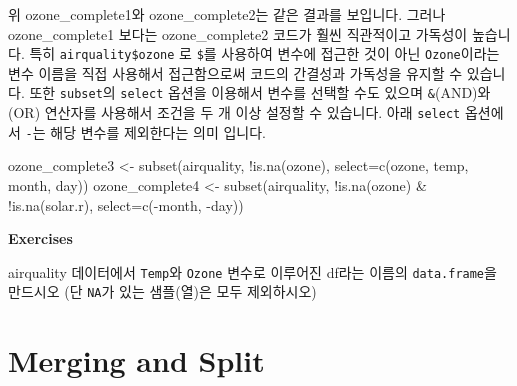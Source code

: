 \documentclass[
]{book}
\newenvironment{Shaded}{\begin{snugshade}}{\end{snugshade}}
\newcommand{\AttributeTok}[1]{\textcolor[rgb]{0.77,0.63,0.00}{#1}}
\newcommand{\FunctionTok}[1]{\textcolor[rgb]{0.00,0.00,0.00}{#1}}
\newcommand{\NormalTok}[1]{#1}
\newcommand{\OtherTok}[1]{\textcolor[rgb]{0.56,0.35,0.01}{#1}}
\newcommand{\SpecialCharTok}[1]{\textcolor[rgb]{0.00,0.00,0.00}{#1}}
\begin{document}
\begin{Shaded}
\end{Shaded}

위 ozone\_complete1와 ozone\_complete2는 같은 결과를 보입니다. 그러나 ozone\_complete1 보다는 ozone\_complete2 코드가 훨씬 직관적이고 가독성이 높습니다. 특히 \texttt{airquality\$ozone} 로 \texttt{\$}를 사용하여 변수에 접근한 것이 아닌 \texttt{Ozone}이라는 변수 이름을 직접 사용해서 접근함으로써 코드의 간결성과 가독성을 유지할 수 있습니다. 또한 \texttt{subset}의 \texttt{select} 옵션을 이용해서 변수를 선택할 수도 있으며 \texttt{\&}(AND)와 \texttt{\textbar{}}(OR) 연산자를 사용해서 조건을 두 개 이상 설정할 수 있습니다. 아래 \texttt{select} 옵션에서 \texttt{-}는 해당 변수를 제외한다는 의미 입니다.

\begin{Shaded}
\begin{Highlighting}[]
\NormalTok{ozone\_complete3 }\OtherTok{\textless{}{-}} \FunctionTok{subset}\NormalTok{(airquality, }\SpecialCharTok{!}\FunctionTok{is.na}\NormalTok{(ozone), }\AttributeTok{select=}\FunctionTok{c}\NormalTok{(ozone, temp, month, day))}
\NormalTok{ozone\_complete4 }\OtherTok{\textless{}{-}} \FunctionTok{subset}\NormalTok{(airquality, }\SpecialCharTok{!}\FunctionTok{is.na}\NormalTok{(ozone) }\SpecialCharTok{\&} \SpecialCharTok{!}\FunctionTok{is.na}\NormalTok{(solar.r), }\AttributeTok{select=}\FunctionTok{c}\NormalTok{(}\SpecialCharTok{{-}}\NormalTok{month, }\SpecialCharTok{{-}}\NormalTok{day))}
\end{Highlighting}
\end{Shaded}

\textbf{Exercises}

airquality 데이터에서 \texttt{Temp}와 \texttt{Ozone} 변수로 이루어진 df라는 이름의 \texttt{data.frame}을 만드시오 (단 \texttt{NA}가 있는 샘플(열)은 모두 제외하시오)

\hypertarget{merging-and-split}{%
\section{Merging and Split}\label{merging-and-split}}
\end{document}
